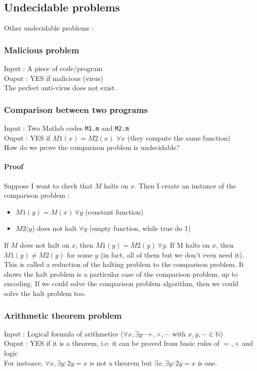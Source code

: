 \subsection{Undecidable problems}

Other undecidable problems :
\subsubsection{Malicious problem}
Input : A piece of code/program\\
Ouput : YES if malicious (virus)\\
The perfect anti-virus does not exist.

\subsubsection{Comparison between two programs}
Input : Two Matlab codes \texttt{M1.m} and \texttt{M2.m}\\
Ouput : YES if $M1(x) = M2(x)$ $\forall x$ (they compute the same function)\\
How do we prove the comparison problem is undecidable?
\paragraph{Proof} Suppose I want to check that $M$ halts on $x$. Then I create an instance of the comparison problem : 
\begin{itemize}
\item $M1(y) = M(x) \ \forall y$ (constant function)
\item $M2(y$) does not halt $\forall y$ (empty function, while true do 1)
\end{itemize}
If $M$ does not halt on $x$, then $M1(y) = M2(y) \ \forall y$. If M halts on $x$, then  $M1(y) \neq M2(y)$ for some $y$ (in fact, all of them but we don't even need it).
This is called a reduction of the halting problem to the comparison problem. It shows the halt problem is a particular case of the comparison problem, up to encoding. If we could solve the comparison problem algorithm, then we could solve the halt problem too.

\subsubsection{Arithmetic theorem problem}
Input : Logical formula of arithmetics ($\forall x, \exists y \cdots +, \times, \cdots$ with $x,y,\cdots \in \mathbb{N}$)\\
Ouput : YES if it is a theorem, i.e. it can be proved from basic rules of $=,\times$ and logic\\
For instance, $\forall x, \exists y : 2y = x$ is not a theorem but  $\exists x, \exists y : 2y = x$ is one.\\

